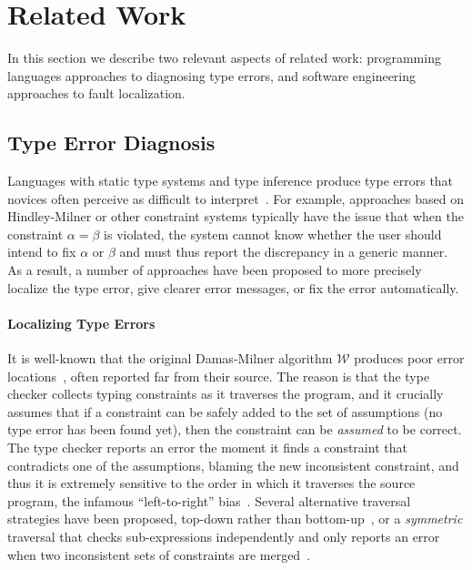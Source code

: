 \section{Related Work}
\label{sec:related-work}

In this section we describe two relevant aspects of related work:
%
programming languages approaches to diagnosing type errors, and
%
software engineering approaches to fault localization.
%

\subsection{Type Error Diagnosis}
\label{sec:type-error-diagnosis}
Languages with static type systems and type inference produce type
errors that novices often perceive as difficult to
interpret~\citep{Wand1986-nw}.
%
For example, approaches based on Hindley-Milner or other constraint
systems typically have the issue that when the constraint $\alpha=\beta$
is violated, the system cannot know whether the user should intend to
fix $\alpha$ or $\beta$ and must thus report the discrepancy in a
generic manner.
%
As a result, a number of approaches have been proposed to
more precisely localize the type error,
give clearer error messages, or
fix the error automatically.
%

\paragraph{Localizing Type Errors}
It is well-known that the original Damas-Milner algorithm $\mathcal{W}$
produces poor error locations~\citep{Wand1986-nw}, often reported far
from their source.
%
The reason is that the type checker collects typing constraints as it
traverses the program, and it crucially assumes that if a constraint can
be safely added to the set of assumptions (\ie no type error has been
found yet), then the constraint can be \emph{assumed} to be correct.
%
The type checker reports an error the moment it finds a constraint that
contradicts one of the assumptions, blaming the new inconsistent
constraint, and thus it is extremely sensitive to the order in which it
traverses the source program, the infamous ``left-to-right''
bias~\citep{McAdam1998-ub}.
%
Several alternative traversal strategies have been proposed, \eg
top-down rather than bottom-up~\citep{Lee1998-ys}, or a \emph{symmetric}
traversal that checks sub-expressions independently and only reports an
error when two inconsistent sets of constraints are
merged~\citep{McAdam1998-ub,Yang1999-yr}.

